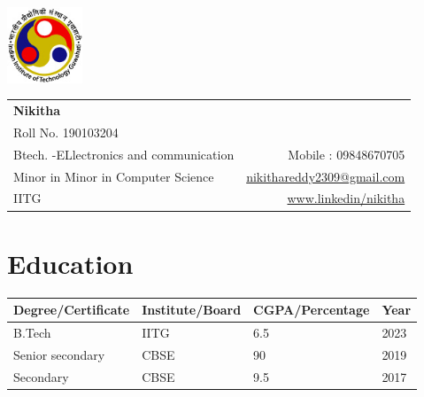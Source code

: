 \documentclass[a4paper,10pt]{report}
\begin{document}
\vspace{-0.1000pt}


\parbox{2.35cm}{

\includegraphics[width=2.25cm,clip]{iitg_logo.jpg}

}
\parbox{\dimexpr\linewidth-2.5cm\relax}{

\begin{tabular*}{\textwidth}{l@{\hskip 1.5cm}r}


\textbf{\huge Nikitha}\\
{Roll No. 190103204}&\href{mailto:}{ }\\
{Btech. -ELlectronics and communication}& Mobile : 09848670705\\
{Minor in Minor in Computer Science}&\href{mailto:nikithareddy2309@gmail.com}{ nikithareddy2309@gmail.com}\\
{IITG} & \href{https://www.www.linkedin/nikitha/}{www.linkedin/nikitha}

\end{tabular*}
}


\vspace{5pt}


\section{Education}
\centering
 \begin{tabu} to 1\textwidth { | X[c] | X[c] | X[c] | X[c]| }
 \hline   \textbf{Degree/Certificate} & \textbf{Institute/Board} & \textbf{CGPA/Percentage} & \textbf{Year} \\
 
\hline B.Tech& IITG& 6.5& 2023\\
\hline Senior secondary& CBSE& 90& 2019\\
\hline Secondary& CBSE& 9.5& 2017\\

\hline
\end{tabu}
\end{document}
